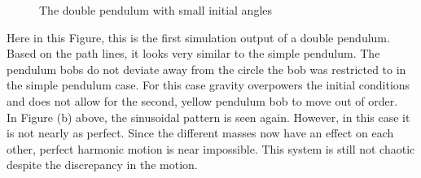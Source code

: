 \documentclass[runningheads]{llncs}
\begin{document}
\begin{figure}%
    \centering
    \qquad
    \caption{The double pendulum with small initial angles}%
    \label{fig:example}%
\end{figure}

Here in this Figure, this is the first simulation output of a double pendulum. Based on the path lines, it looks very similar to the simple pendulum. The pendulum bobs do not deviate away from the circle the bob was restricted to in the simple pendulum case. For this case gravity overpowers the initial conditions and does not allow for the second, yellow pendulum bob to move out of order. \\

In Figure (b) above, the sinusoidal pattern is seen again. However, in this case it is not nearly as perfect. Since the different masses now have an effect on each other, perfect harmonic motion is near impossible. This system is still not chaotic despite the discrepancy in the motion.
\end{document}
